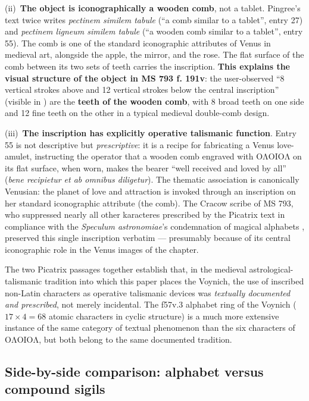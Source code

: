 \noindent (ii)~\textbf{The object is iconographically a wooden comb}, not a
tablet. Pingree's text twice writes \textit{pectinem similem tabule} (``a comb
similar to a tablet'', entry 27) and \textit{pectinem ligneum similem tabule}
(``a wooden comb similar to a tablet'', entry 55). The comb is one of the
standard iconographic attributes of Venus in medieval art, alongside the
apple, the mirror, and the rose. The flat surface of the comb between its two
sets of teeth carries the inscription. \textbf{This explains the visual
structure of the object in MS 793 f. 191v}: the user-observed ``8 vertical
strokes above and 12 vertical strokes below the central inscription'' (visible
in ) are the \textbf{teeth of
the wooden comb}, with 8 broad teeth on one side and 12 fine teeth on the
other in a typical medieval double-comb design.

\noindent (iii)~\textbf{The inscription has explicitly operative talismanic
function}. Entry 55 is not descriptive but \emph{prescriptive}: it is a recipe
for fabricating a Venus love-amulet, instructing the operator that a wooden
comb engraved with $\mathrm{O\Lambda OIO\Lambda}$ on its flat surface, when
worn, makes the bearer ``well received and loved by all'' (\textit{bene
recipietur et ab omnibus diligetur}). The thematic association is canonically
Venusian: the planet of love and attraction is invoked through an inscription
on her standard iconographic attribute (the comb). The Cracow scribe of MS
793, who suppressed nearly all other karacteres prescribed by the Picatrix
text in compliance with the \textit{Speculum astronomiae}'s condemnation of
magical alphabets \citep[see][p.~105]{sniezynska2009}, preserved this single
inscription verbatim --- presumably because of its central iconographic role
in the Venus images of the chapter.

\medskip

The two Picatrix passages together establish that, in the medieval
astrological-talismanic tradition into which this paper places the Voynich,
the use of inscribed non-Latin characters as operative talismanic devices
was \emph{textually documented and prescribed}, not merely incidental.
The f57v.3 alphabet ring of the Voynich ($17\times 4 = 68$ atomic characters
in cyclic structure) is a much more extensive instance of the same category
of textual phenomenon than the six characters of
$\mathrm{O\Lambda OIO\Lambda}$, but both belong to the same documented
tradition.

\subsection{Side-by-side comparison: alphabet versus compound sigils}
\label{sec:vc4_alphabet}

